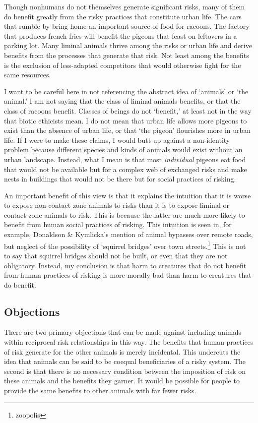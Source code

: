 Though nonhumans do not themselves generate significant risks, many of them do
benefit greatly from the risky practices that constitute urban life. The cars
that rumble by bring home an important source of food for racoons. The factory
that produces french fries will benefit the pigeons that feast on leftovers in
a parking lot.\autocite[68]{zoopolis} Many liminal animals thrive among the risks
or urban life and derive benefits from the processes that generate that risk.
Not least among the benefits is the exclusion of less-adapted competitors that
would otherwise fight for the same resources.

I want to be careful here in not referencing the abstract idea of ‘animals’ or
‘the animal.’ I am not saying that the class of liminal animals benefits, or
that the class of racoons benefit. Classes of beings do not ‘benefit,’ at least
not in the way that biotic ethicists mean. I do not mean that urban life allows
more pigeons to exist than the absence of urban life, or that ‘the pigeon’
flourishes more in urban life. If I were to make these claims, I would butt up
against a non-identity problem because different species and kinds of animals
would exist without an urban landscape. Instead, what I mean is that most
\emph{individual} pigeons eat food that would not be available but for a complex
web of exchanged risks and make nests in buildings that would not be there but
for social practices of risking.

An important benefit of this view is that it explains the intuition that it is
worse to expose non-contact zone animals to risks than it is to expose liminal
or contact-zone animals to risk. This is because the latter are
much more likely to benefit from human social practices of risking. This
intuition is seen in, for example, Donaldson \& Kymlicka’s mention of
animal bypasses over remote roads, but neglect of the possibility of ‘squirrel
bridges’ over town streets.\footnote[167]{zoopolis} This is not to say that squirrel
bridges should not be built, or even that they are not obligatory. Instead, my
conclusion is that harm to creatures that do not benefit from human practices
of risking is more morally bad than harm to creatures that do benefit.

\subsection{Objections}

There are two primary objections that can be made against including animals
within reciprocal risk relationships in this way. The benefits that human
practices of risk generate for the other animals is merely incidental. This
undercuts the idea that animals can be said to be coequal beneficiaries of a
risky system.  The second is that there is no necessary condition between the
imposition of risk on these animals and the benefits they garner. It would be
possible for people to provide the same benefits to other animals with far
fewer risks.

